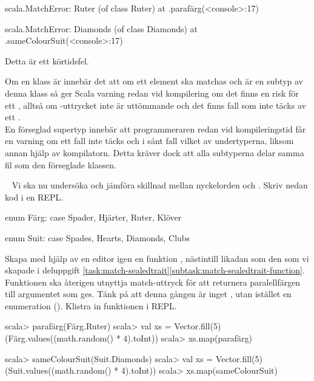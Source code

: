\SubtaskSolved
\ifswedish
\begin{REPL}
scala.MatchError: Ruter (of class Ruter)
  at .parafärg(<console>:17)
\end{REPL}
\else
\begin{REPL}
scala.MatchError: Diamonds (of class Diamonds)
  at .sameColourSuit(<console>:17)
\end{REPL}
\fi
Detta är ett körtidsfel.

\SubtaskSolved  Om en klass är  innebär det att om ett element ska matchas och är en subtyp av denna klass så ger Scala varning redan vid kompilering om det finns en risk för ett , alltså om -uttrycket inte är uttömmande och det finns fall som inte täcks av ett .\\
En förseglad supertyp innebär att programmeraren redan vid kompileringstid får en varning om ett fall inte täcks och i sånt fall vilket av undertyperna, liksom annan hjälp av kompilatorn. Detta kräver dock att alla subtyperna delar samma fil som den förseglade klassen.



\QUESTEND



\QUESTBEGIN
\Task	\what~ Vi ska nu undersöka och jämföra skillnad mellan nyckelorden  och . Skriv nedan kod i en REPL.
\ifswedish
\begin{Code}
enum Färg:
  case Spader, Hjärter, Ruter, Klöver
\end{Code}
\else
\begin{Code}
enum Suit:
  case Spades, Hearts, Diamonds, Clubs
\end{Code}
\fi

\Subtask Skapa med hjälp av en editor igen en funktion \ifswedish{}\else{}\fi, nästintill likadan som den som vi skapade i deluppgift \ref{task:match-sealedtrait}\ref{subtask:match-sealedtrait-function}. Funktionen ska återigen utnyttja match-uttryck för att returnera paralellfärgen till argumentet som ges. Tänk på att denna gången är \ifswedish{}\else{}\fi{} inget , utan istället en enumeration (). Klistra in funktionen i REPL.
\ifswedish
\begin{REPL}
scala> parafärg(Färg.Ruter)
scala> val xs = Vector.fill(5)(Färg.values((math.random() * 4).toInt))
scala> xs.map(parafärg)
\end{REPL}
\else
\begin{REPL}
scala> sameColourSuit(Suit.Diamonds)
scala> val xs = Vector.fill(5)(Suit.values((math.random() * 4).toInt))
scala> xs.map(sameColourSuit)
\end{REPL}
\fi



